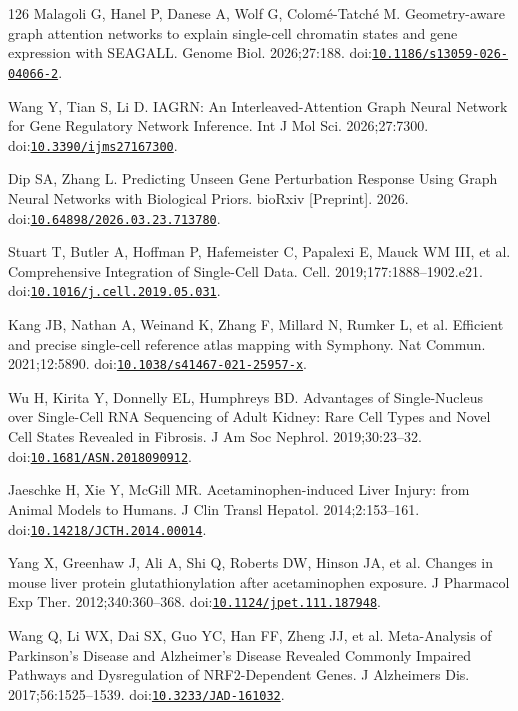 \begin{thebibliography}{126}
Malagoli G, Hanel P, Danese A, Wolf G, Colomé-Tatché M. Geometry-aware graph attention networks to explain single-cell chromatin states and gene expression with SEAGALL. Genome Biol. 2026;27:188. doi:\href{https://doi.org/10.1186/s13059-026-04066-2}{\nolinkurl{10.1186/s13059-026-04066-2}}.

Wang Y, Tian S, Li D. IAGRN: An Interleaved-Attention Graph Neural Network for Gene Regulatory Network Inference. Int J Mol Sci. 2026;27:7300. doi:\href{https://doi.org/10.3390/ijms27167300}{\nolinkurl{10.3390/ijms27167300}}.

Dip SA, Zhang L. Predicting Unseen Gene Perturbation Response Using Graph Neural Networks with Biological Priors. bioRxiv [Preprint]. 2026. doi:\href{https://doi.org/10.64898/2026.03.23.713780}{\nolinkurl{10.64898/2026.03.23.713780}}.

Stuart T, Butler A, Hoffman P, Hafemeister C, Papalexi E, Mauck WM III, et al. Comprehensive Integration of Single-Cell Data. Cell. 2019;177:1888--1902.e21. doi:\href{https://doi.org/10.1016/j.cell.2019.05.031}{\nolinkurl{10.1016/j.cell.2019.05.031}}.

Kang JB, Nathan A, Weinand K, Zhang F, Millard N, Rumker L, et al. Efficient and precise single-cell reference atlas mapping with Symphony. Nat Commun. 2021;12:5890. doi:\href{https://doi.org/10.1038/s41467-021-25957-x}{\nolinkurl{10.1038/s41467-021-25957-x}}.

Wu H, Kirita Y, Donnelly EL, Humphreys BD. Advantages of Single-Nucleus over Single-Cell RNA Sequencing of Adult Kidney: Rare Cell Types and Novel Cell States Revealed in Fibrosis. J Am Soc Nephrol. 2019;30:23--32. doi:\href{https://doi.org/10.1681/ASN.2018090912}{\nolinkurl{10.1681/ASN.2018090912}}.

Jaeschke H, Xie Y, McGill MR. Acetaminophen-induced Liver Injury: from Animal Models to Humans. J Clin Transl Hepatol. 2014;2:153--161. doi:\href{https://doi.org/10.14218/JCTH.2014.00014}{\nolinkurl{10.14218/JCTH.2014.00014}}.

Yang X, Greenhaw J, Ali A, Shi Q, Roberts DW, Hinson JA, et al. Changes in mouse liver protein glutathionylation after acetaminophen exposure. J Pharmacol Exp Ther. 2012;340:360--368. doi:\href{https://doi.org/10.1124/jpet.111.187948}{\nolinkurl{10.1124/jpet.111.187948}}.

Wang Q, Li WX, Dai SX, Guo YC, Han FF, Zheng JJ, et al. Meta-Analysis of Parkinson's Disease and Alzheimer's Disease Revealed Commonly Impaired Pathways and Dysregulation of NRF2-Dependent Genes. J Alzheimers Dis. 2017;56:1525--1539. doi:\href{https://doi.org/10.3233/JAD-161032}{\nolinkurl{10.3233/JAD-161032}}.


\end{thebibliography}
